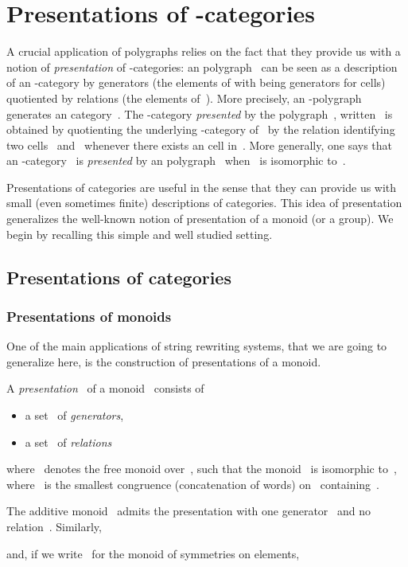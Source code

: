 \documentclass{LMCS}
\begin{document}
\section{Presentations of -categories}
\label{sec:pres-n-cat}
A crucial application of polygraphs relies on the fact that they provide us with
a notion of \emph{presentation} of -categories: an \nbd{}polygraph~
can be seen as a description of an -category by generators (the elements of
 with  being generators for \nbd{}cells) quotiented by
relations (the elements of~). More precisely, an -polygraph~
generates an \nbd{}category~. The -category \emph{presented} by
the polygraph~, written~ is obtained by quotienting the
underlying -category of~ by the relation identifying two
\nbd{}cells~ and~ whenever there exists an \nbd{}cell
 in~. More generally, one says that an -category~ is
\emph{presented} by an \nbd{}polygraph~ when~ is isomorphic
to~.

Presentations of categories are useful in the sense that they can provide us
with small (even sometimes finite) descriptions of categories. This idea of
presentation generalizes the well-known notion of presentation of a monoid (or a
group). We begin by recalling this simple and well studied setting.

\subsection{Presentations of categories}
\subsubsection{Presentations of monoids}
\label{sec:mon-pres}
One of the main applications of string rewriting systems, that we are going to
generalize here, is the construction of presentations of a monoid.

\begin{defi}
  A \emph{presentation}~ of a monoid~ consists of
  \begin{itemize}
  \item a set~ of \emph{generators},
  \item a set~ of \emph{relations}
  \end{itemize}
  where~ denotes the free monoid over~, such that the
  monoid~ is isomorphic to~, where~ is the
  smallest congruence (\wrt concatenation of words) on~
  containing~.
\end{defi}

\begin{exa}
  \label{ex:pres-mon}
  The additive monoid~ admits the presentation with one generator~ and no
  relation~. Similarly,
  
  and, if we write~ for the monoid of symmetries on 
  elements,
  
\end{exa}
\end{document}
